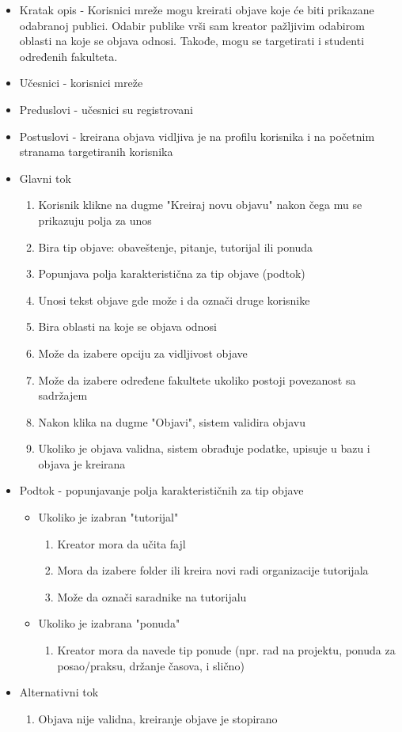 \begin{itemize}
	\item Kratak opis - Korisnici mreže mogu kreirati objave koje će biti prikazane odabranoj publici. Odabir publike vrši sam kreator pažljivim odabirom oblasti na koje se objava odnosi. Takođe, mogu se targetirati i studenti određenih fakulteta.
	\item Učesnici - korisnici mreže
	\item Preduslovi - učesnici su registrovani
	\item Postuslovi - kreirana objava vidljiva je na profilu korisnika i na početnim stranama targetiranih korisnika
	\item Glavni tok
    	\begin{enumerate}
		\item Korisnik klikne na dugme "Kreiraj novu objavu" nakon čega mu se prikazuju polja za unos
		\item Bira tip objave: obaveštenje, pitanje, tutorijal ili ponuda
		\item Popunjava polja karakteristična za tip objave (podtok)
		\item Unosi tekst objave gde može i da označi druge korisnike
	    	\item Bira oblasti na koje se objava odnosi
	    	\item Može da izabere opciju za vidljivost objave
	    	\item Može da izabere određene fakultete ukoliko postoji povezanost sa sadržajem
		\item Nakon klika na dugme "Objavi", sistem validira objavu 
	    	\item Ukoliko je objava validna, sistem obrađuje podatke, upisuje u bazu i objava je kreirana
    	\end{enumerate}
	\item Podtok - popunjavanje polja karakterističnih za tip objave
    	\begin{itemize}
        	\item Ukoliko je izabran "tutorijal"
            	\begin{enumerate}
	         	\item Kreator mora da učita fajl
	         	\item Mora da izabere folder ili kreira novi radi organizacije tutorijala
	         	\item Može da označi saradnike na tutorijalu
            	\end{enumerate}
         	\item Ukoliko je izabrana "ponuda"
            	\begin{enumerate}
            		\item Kreator mora da navede tip ponude (npr. rad na projektu, ponuda za posao/praksu, držanje časova, i slično)
            	\end{enumerate}    
	 \end{itemize}
	 \item Alternativni tok
	 \begin{enumerate} 
	 	\item Objava nije validna, kreiranje objave je stopirano
	 \end{enumerate}
\end{itemize}

